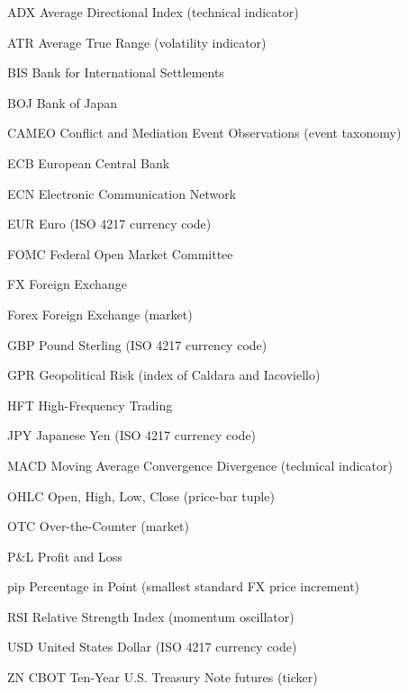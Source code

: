 \begin{siglas}
    \item[ADX] Average Directional Index (technical indicator)
    \item[ATR] Average True Range (volatility indicator)
    \item[BIS] Bank for International Settlements
    \item[BOJ] Bank of Japan
    \item[CAMEO] Conflict and Mediation Event Observations (event taxonomy)
    \item[ECB] European Central Bank
    \item[ECN] Electronic Communication Network
    \item[EUR] Euro (ISO 4217 currency code)
    \item[FOMC] Federal Open Market Committee
    \item[FX] Foreign Exchange
    \item[Forex] Foreign Exchange (market)
    \item[GBP] Pound Sterling (ISO 4217 currency code)
    \item[GPR] Geopolitical Risk (index of Caldara and Iacoviello)
    \item[HFT] High-Frequency Trading
    \item[JPY] Japanese Yen (ISO 4217 currency code)
    \item[MACD] Moving Average Convergence Divergence (technical indicator)
    \item[OHLC] Open, High, Low, Close (price-bar tuple)
    \item[OTC] Over-the-Counter (market)
    \item[P\&L] Profit and Loss
    \item[pip] Percentage in Point (smallest standard FX price increment)
    \item[RSI] Relative Strength Index (momentum oscillator)
    \item[USD] United States Dollar (ISO 4217 currency code)
    \item[ZN] CBOT Ten-Year U.S. Treasury Note futures (ticker)

\end{siglas}
